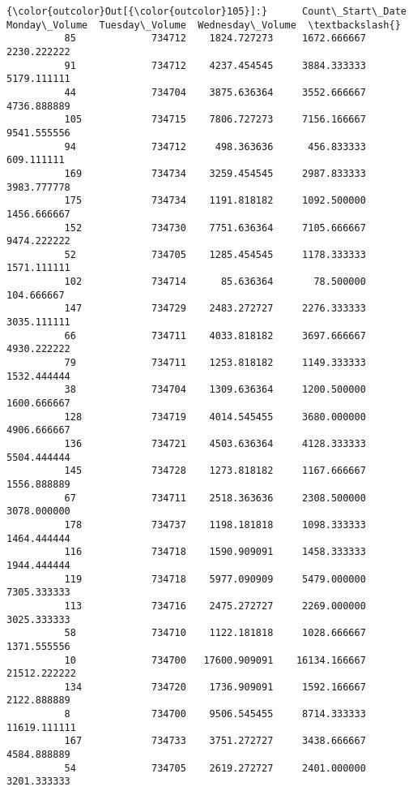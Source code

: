 \documentclass[11pt]{article}
\begin{document}
\begin{Verbatim}[commandchars=\\\{\}]
{\color{outcolor}Out[{\color{outcolor}105}]:}      Count\_Start\_Date  Monday\_Volume  Tuesday\_Volume  Wednesday\_Volume  \textbackslash{}
          85             734712    1824.727273     1672.666667       2230.222222   
          91             734712    4237.454545     3884.333333       5179.111111   
          44             734704    3875.636364     3552.666667       4736.888889   
          105            734715    7806.727273     7156.166667       9541.555556   
          94             734712     498.363636      456.833333        609.111111   
          169            734734    3259.454545     2987.833333       3983.777778   
          175            734734    1191.818182     1092.500000       1456.666667   
          152            734730    7751.636364     7105.666667       9474.222222   
          52             734705    1285.454545     1178.333333       1571.111111   
          102            734714      85.636364       78.500000        104.666667   
          147            734729    2483.272727     2276.333333       3035.111111   
          66             734711    4033.818182     3697.666667       4930.222222   
          79             734711    1253.818182     1149.333333       1532.444444   
          38             734704    1309.636364     1200.500000       1600.666667   
          128            734719    4014.545455     3680.000000       4906.666667   
          136            734721    4503.636364     4128.333333       5504.444444   
          145            734728    1273.818182     1167.666667       1556.888889   
          67             734711    2518.363636     2308.500000       3078.000000   
          178            734737    1198.181818     1098.333333       1464.444444   
          116            734718    1590.909091     1458.333333       1944.444444   
          119            734718    5977.090909     5479.000000       7305.333333   
          113            734716    2475.272727     2269.000000       3025.333333   
          58             734710    1122.181818     1028.666667       1371.555556   
          10             734700   17600.909091    16134.166667      21512.222222   
          134            734720    1736.909091     1592.166667       2122.888889   
          8              734700    9506.545455     8714.333333      11619.111111   
          167            734733    3751.272727     3438.666667       4584.888889   
          54             734705    2619.272727     2401.000000       3201.333333   

\end{Verbatim}
\end{document}
